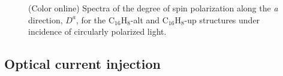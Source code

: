 \documentclass[pss]{wiley2sp} %
\begin{document}
\begin{figure}[t]
\hfill
{}
\caption{(Color online) Spectra of the degree of spin polarization along the
\emph{a} direction, {$D^{a}$}, for the C$_{16}$H$_{8}$-alt and
C$_{16}$H$_{8}$-up structures under incidence of circularly polarized light.\label{fig:Da}}
\end{figure}


\subsection{Optical current injection}\label{subsec:results-eta}
\end{document}

